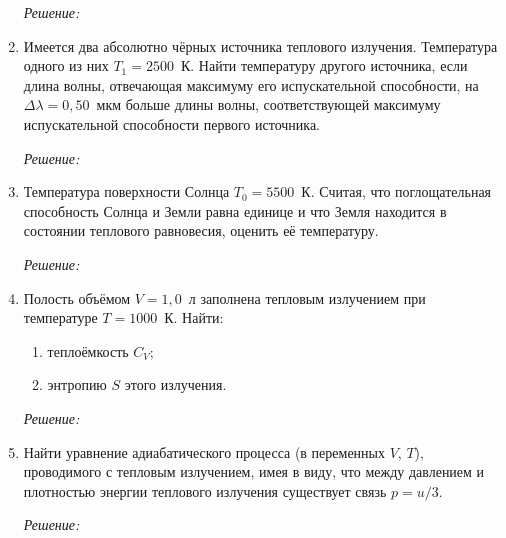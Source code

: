 \begin{enumerate}
\emph{Решение:}

\newpage

\item Имеется два абсолютно чёрных источника теплового излучения. Температура
одного из них \( T_1 = 2500 \)~К. Найти температуру другого источника, если
длина волны, отвечающая максимуму его испускательной способности, на
\( \Delta\lambda = 0,\!50 \)~мкм больше длины волны, соответствующей максимуму
испускательной способности первого источника.

\emph{Решение:}

\newpage

\item Температура поверхности Солнца \( T_0 = 5500 \)~К. Считая, что
поглощательная способность Солнца и Земли равна единице и что Земля находится в
состоянии теплового равновесия, оценить её температуру.

\emph{Решение:}

\newpage

\item Полость объёмом \( V = 1,\!0 \)~л заполнена тепловым излучением при
температуре \( T = 1000 \)~К. Найти:
\begin{enumerate}
    \item теплоёмкость \( C_V \);
    \item энтропию \( S \) этого излучения.
\end{enumerate}

\emph{Решение:}

\newpage

\item Найти уравнение адиабатического процесса (в переменных \( V \), \( T \)),
проводимого с тепловым излучением, имея в виду, что между давлением и плотностью
энергии теплового излучения существует связь \( p = u/3 \).

\emph{Решение:}

\end{enumerate}